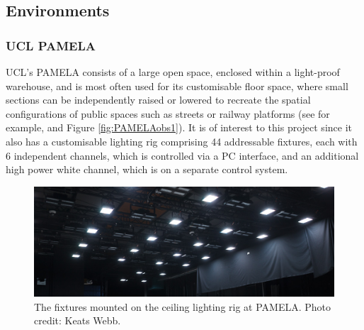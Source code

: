 

\subsection{Environments}

\subsubsection{UCL PAMELA} \label{sec:PAMELA}

\gls{UCL}'s \acrfull{PAMELA} consists of a large open space, enclosed within a light-proof warehouse, and is most often used for its customisable floor space, where small sections can be independently raised or lowered to recreate the spatial configurations of public spaces such as streets or railway platforms (see \citet{cheng_effect_2018} for example, and Figure \ref{fig:PAMELAobs1}). It is of interest to this project since it also has a customisable lighting rig comprising 44 addressable fixtures, each with 6 independent channels, which is controlled via a PC interface, and an additional high power white channel, which is on a separate control system. 

\begin{figure}[hbtp]
\includegraphics[max width=\textwidth]{figs/tablet/PAMELAlights1.jpg}
\caption{The fixtures mounted on the ceiling lighting rig at \acrshort{PAMELA}. Photo credit: Keats Webb.}
\label{fig:PAMELAlights1}
\end{figure}

